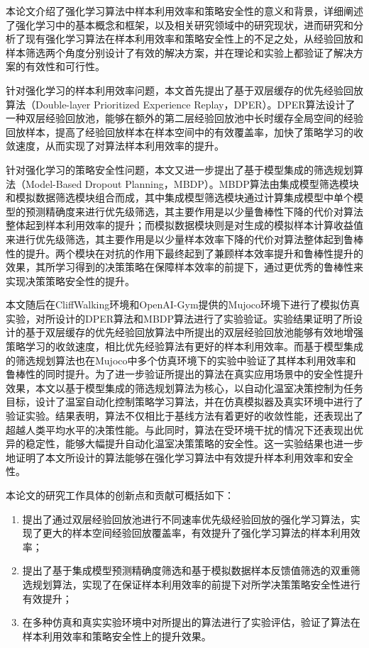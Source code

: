 本论文介绍了强化学习算法中样本利用效率和策略安全性的意义和背景，详细阐述了强化学习中的基本概念和框架，以及相关研究领域中的研究现状，进而研究和分析了现有强化学习算法在样本利用效率和策略安全性上的不足之处，从经验回放和样本筛选两个角度分别设计了有效的解决方案，并在理论和实验上都验证了解决方案的有效性和可行性。

针对强化学习的样本利用效率问题，本文首先提出了基于双层缓存的优先经验回放算法（Double-layer Prioritized Experience Replay，DPER）。DPER算法设计了一种双层经验回放池，能够在额外的第二层经验回放池中长时缓存全局空间的经验回放样本，提高了经验回放样本在样本空间中的有效覆盖率，加快了策略学习的收敛速度，从而实现了对算法样本利用效率的提升。

针对强化学习的策略安全性问题，本文又进一步提出了基于模型集成的筛选规划算法（Model-Based Dropout Planning，MBDP）。MBDP算法由集成模型筛选模块和模拟数据筛选模块组合而成，其中集成模型筛选模块通过计算集成模型中单个模型的预测精确度来进行优先级筛选，其主要作用是以少量鲁棒性下降的代价对算法整体起到样本利用效率的提升；而模拟数据模块则是对生成的模拟样本计算收益值来进行优先级筛选，其主要作用是以少量样本效率下降的代价对算法整体起到鲁棒性的提升。两个模块在对抗的作用下最终起到了兼顾样本效率提升和鲁棒性提升的效果，其所学习得到的决策策略在保障样本效率的前提下，通过更优秀的鲁棒性来实现决策策略安全性的提升。

本文随后在CliffWalking环境和OpenAI-Gym提供的Mujoco环境下进行了模拟仿真实验，对所设计的DPER算法和MBDP算法进行了实验验证。实验结果证明了所设计的基于双层缓存的优先经验回放算法中所提出的双层经验回放池能够有效地增强策略学习的收敛速度，相比优先经验算法有更好的样本利用效率。而基于模型集成的筛选规划算法也在Mujoco中多个仿真环境下的实验中验证了其样本利用效率和鲁棒性的同时提升。为了进一步验证所提出的算法在真实应用场景中的安全性提升效果，本文以基于模型集成的筛选规划算法为核心，以自动化温室决策控制为任务目标，设计了温室自动化控制策略学习算法，并在仿真模拟器及真实环境中进行了验证实验。结果表明，算法不仅相比于基线方法有着更好的收敛性能，还表现出了超越人类平均水平的决策性能。与此同时，算法在受环境干扰的情况下还表现出优异的稳定性，能够大幅提升自动化温室决策策略的安全性。这一实验结果也进一步地证明了本文所设计的算法能够在强化学习算法中有效提升样本利用效率和安全性。

本论文的研究工作具体的创新点和贡献可概括如下：

\begin{enumerate}
    \item 提出了通过双层经验回放池进行不同速率优先级经验回放的强化学习算法，实现了更大的样本空间经验回放覆盖率，有效提升了强化学习算法的样本利用效率；
    \item 提出了基于集成模型预测精确度筛选和基于模拟数据样本反馈值筛选的双重筛选规划算法，实现了在保证样本利用效率的前提下对所学决策策略安全性进行有效提升；
    \item 在多种仿真和真实实验环境中对所提出的算法进行了实验评估，验证了算法在样本利用效率和策略安全性上的提升效果。
\end{enumerate}

